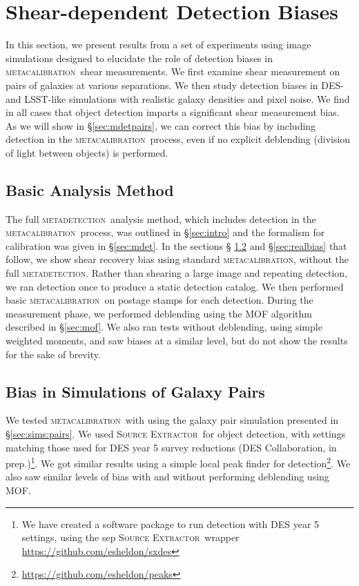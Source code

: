\documentclass[iop, twocolappendix, appendixfloats, numberedappendix, apj]{hackemulateapj}
\newcommand{\mcal}{\textsc{metacalibration}}
\newcommand{\mdet}{\textsc{metadetection}}
\newcommand{\sx}{\textsc{Source Extractor}}
\begin{document}
\section{Shear-dependent Detection Biases}\label{sec:detbiases}

In this section, we present results from a set of experiments using image
simulations designed to elucidate the role of detection biases in \mcal\ shear
measurements.  We first examine shear measurement on pairs of galaxies at
various separations.  We then study detection biases in DES- and LSST-like
simulations with realistic galaxy densities and pixel noise. We find in all
cases that object detection imparts a significant shear measurement bias. As we
will show in \S \ref{sec:mdetpairs}, we can correct this bias by including
detection in the \mcal\ process, even if no explicit deblending (division of
light between objects) is performed.

\subsection{Basic Analysis Method}

The full \mdet\ analysis method, which includes detection in the \mcal\
process, was outlined in \S \ref{sec:intro} and the formalism for calibration
was given in \S \ref{sec:mdet}.  In the sections \S
\ref{sec:pairbias} and \S \ref{sec:realbias} that follow, we show shear
recovery bias using standard \mcal, without the full \mdet.   Rather than shearing
a large image and repeating detection, we ran detection once to produce a
static detection catalog.  We then performed basic \mcal\ on postage stamps for
each detection.  During the measurement phase, we performed deblending using
the MOF algorithm described in \S \ref{sec:mof}.  We also ran tests without
deblending, using simple weighted moments, and saw biases at a similar level,
but do not show the results for the sake of brevity.

\subsection{Bias in Simulations of Galaxy Pairs} \label{sec:pairbias}

We tested \mcal\ with using the galaxy pair simulation presented
in \S \ref{sec:sims:pairs}. We used \sx\ for object detection, with settings
matching those used for DES year 5 survey reductions (DES Collaboration, in
prep.)\footnote{We have created a software package to run detection with DES
year 5 settings, using the sep \sx\ wrapper
\url{https://github.com/esheldon/sxdes}}.  We got similar results using a
simple local peak finder for
detection\footnote{\url{https://github.com/esheldon/peaks}}.  We also saw
similar levels of bias with and without performing deblending using MOF.
\end{document}
